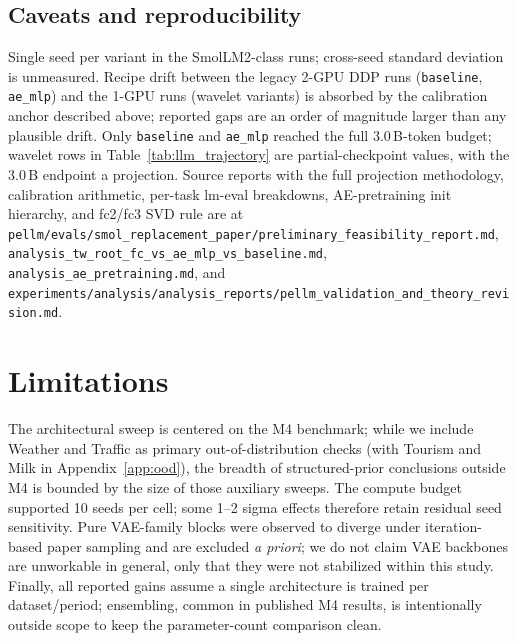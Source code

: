 \documentclass{article}
\begin{document}
\subsection{Caveats and reproducibility}

\begin{sloppypar}
Single seed per variant in the SmolLM2-class runs; cross-seed standard deviation is unmeasured. Recipe drift between the legacy 2-GPU DDP runs (\texttt{baseline}, \texttt{ae\_mlp}) and the 1-GPU runs (wavelet variants) is absorbed by the calibration anchor described above; reported gaps are an order of magnitude larger than any plausible drift. Only \texttt{baseline} and \texttt{ae\_mlp} reached the full 3.0\,B-token budget; wavelet rows in Table~\ref{tab:llm_trajectory} are partial-checkpoint values, with the 3.0\,B endpoint a projection. Source reports with the full projection methodology, calibration arithmetic, per-task lm-eval breakdowns, AE-pretraining init hierarchy, and fc2/fc3 SVD rule are at \nolinkurl{pellm/evals/smol_replacement_paper/preliminary_feasibility_report.md}, \nolinkurl{analysis_tw_root_fc_vs_ae_mlp_vs_baseline.md}, \nolinkurl{analysis_ae_pretraining.md}, and \nolinkurl{experiments/analysis/analysis_reports/pellm_validation_and_theory_revision.md}.
\end{sloppypar}

\section{Limitations}
\label{sec:limitations}

The architectural sweep is centered on the M4 benchmark; while we include Weather and Traffic as primary out-of-distribution checks (with Tourism and Milk in Appendix~\ref{app:ood}), the breadth of structured-prior conclusions outside M4 is bounded by the size of those auxiliary sweeps. The compute budget supported 10 seeds per cell; some 1--2 sigma effects therefore retain residual seed sensitivity. Pure VAE-family blocks were observed to diverge under iteration-based paper sampling and are excluded \emph{a priori}; we do not claim VAE backbones are unworkable in general, only that they were not stabilized within this study. Finally, all reported gains assume a single architecture is trained per dataset/period; ensembling, common in published M4 results, is intentionally outside scope to keep the parameter-count comparison clean.


\newpage

\end{document}
